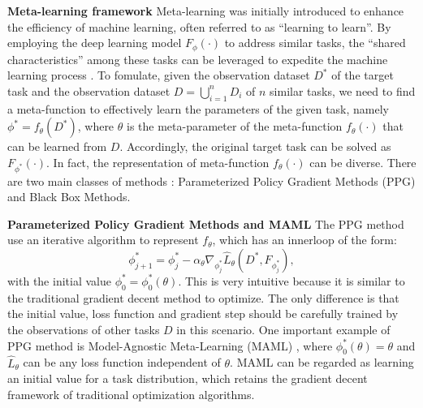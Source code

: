 \documentclass{article}
\begin{document}
\textbf{Meta-learning framework}
Meta-learning was initially introduced to enhance the efficiency of machine learning, often referred to as ``learning to learn''.
By employing the deep learning model $F_\phi(\cdot)$ to address similar tasks, the ``shared characteristics'' among these tasks can be leveraged to expedite the machine learning process \cite{raghu2019rapid}.
To fomulate, given the observation dataset $D^*$ of the target task and the observation dataset $D=\bigcup_{i=1}^n D_i$ of $n$ similar tasks, we need to find a meta-function to effectively learn the parameters of the given task, namely $\phi^*=f_\theta(D^*)$,
where $\theta$ is the meta-parameter of the meta-function $f_\theta(\cdot)$ that can be learned from $D$. Accordingly, the original target task can be solved as $F_{\phi^*}(\cdot)$.
In fact, the representation of meta-function $f_\theta(\cdot)$ can be diverse. There are two main classes of methods \cite{beck2023survey}:  Parameterized Policy Gradient Methods (PPG) and Black Box Methods.

\textbf{Parameterized Policy Gradient Methods and MAML}
The PPG method use an iterative algorithm to represent $f_\theta$, which has an innerloop of the form:
$$
\phi^*_{j+1}=\phi_j^*-\alpha_\theta \nabla_{\phi_j^*} \hat{L}_\theta\left(D^*, F_{\phi_j^*}\right),
$$
with the initial value $\phi_0^*=\phi_0^*(\theta)$.
This is very intuitive because it is similar to the traditional gradient decent method to optimize. 
The only difference is that the initial value, loss function and gradient step should be carefully trained by the observations of other tasks $D$ in this scenario.
One important example of PPG method is  Model-Agnostic Meta-Learning (MAML) \cite{finn2017model}, where $\phi_0^*(\theta)=\theta$ and $\hat{L}_\theta$ can be any loss function independent of $\theta$.
MAML can be regarded as learning an initial value for a task distribution, which retains the gradient decent framework of traditional optimization algorithms.
\end{document}
